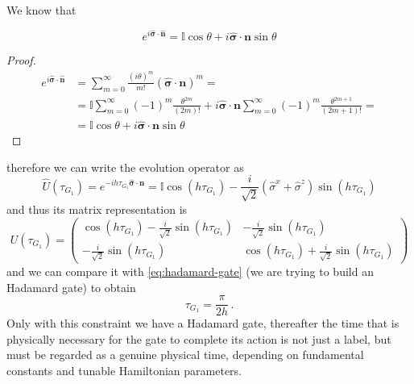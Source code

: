 We know that
\begin{theorem}
\begin{equation*}
e^{i\hat{\boldsymbol{\sigma}} \cdot \hat{\boldsymbol{n}}} = \mathbb{I}\cos\theta + i\hat{\boldsymbol{\sigma}} \cdot \boldsymbol{n} \sin\theta
\end{equation*}
\end{theorem}
\begin{proof}
\begin{equation*}
\begin{split}
 e^{i\hat{\boldsymbol{\sigma}} \cdot \hat{\boldsymbol{n}}} &=  \sum_{m=0}^\infty \frac{(i\theta)^m}{m!} (\hat{\boldsymbol{\sigma}} \cdot \boldsymbol{n} )^m = \\
    &= \mathbb{I} \sum_{m=0}^\infty (-1)^m \frac{\theta^{2m}}{(2m)!}  + i\hat{\boldsymbol{\sigma}} \cdot \boldsymbol{n} \sum_{m=0}^\infty (-1)^m \frac{\theta^{2m+1}}{(2m+1)!} = \\
&= \mathbb{I}\cos\theta + i\hat{\boldsymbol{\sigma}} \cdot \boldsymbol{n} \sin\theta
\end{split}
\end{equation*}
\end{proof}
therefore we can write the evolution operator as
\begin{equation*}
    \hat{U}(\tau_{G_1}) = e^{-ih\tau_{G_1} \hat{\boldsymbol{\sigma}} \cdot \boldsymbol{n}} = \mathbb{I}\cos(h\tau_{G_1}) - \frac{i}{\sqrt{2}} (\hat{\sigma}^x + \hat{\sigma}^z) \sin(h\tau_{G_1})
\end{equation*}
and thus its matrix representation is
\begin{equation*}
    U(\tau_{G_1}) = 
    \begin{pmatrix}
    \cos(h\tau_{G_1}) - \frac{i}{\sqrt{2}} \sin(h\tau_{G_1})  & - \frac{i}{\sqrt{2}} \sin(h\tau_{G_1}) \\
    - \frac{i}{\sqrt{2}} \sin(h\tau_{G_1}) & \cos(h\tau_{G_1}) + \frac{i}{\sqrt{2}} \sin(h\tau_{G_1})
    \end{pmatrix}
\end{equation*}
and we can compare it with \eqref{eq:hadamard-gate} (we are trying to build an Hadamard gate) to obtain
\begin{equation*}
    \tau_{G_1} = \frac{\pi}{2h}\,.
\end{equation*}
Only with this constraint we have a Hadamard gate, thereafter the time that is physically necessary for the gate to complete its action is not just a
label, but must be regarded as a genuine physical time, depending on fundamental constants and tunable Hamiltonian parameters.
